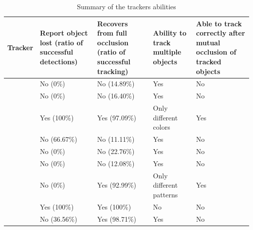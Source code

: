 \begin{landscape}
\begin{table}
\centering
\begin{tabular}{p{5cm}|p{3cm}|p{4cm}|p{5cm}|p{5cm}}
Tracker & Report object lost (ratio of successful detections) & Recovers from full occlusion (ratio of successful tracking)& Ability to track multiple objects & Able to track correctly after mutual occlusion of tracked objects \\
\hline
\boost{} & No (0\%)& No (14.89\%) & Yes & No \\
\corr{} & No (0\%)& No (16.40\%)& Yes & No \\
\hsv{} & Yes (100\%)& Yes (97.09\%) & Only different colors & Yes \\
\medflow{} & No (66.67\%)& No (11.11\%)& Yes & No \\
\mil{} & No (0\%) & No (22.76\%) & Yes & No \\
\mosse{} & No (0\%) & No (12.08\%) & Yes & No \\
\patt{} & No (0\%) & Yes (92.99\%) & Only different patterns & Yes \\
\simback{} & Yes (100\%) & Yes (100\%) & No & No \\
\tld{} & No (36.56\%) & Yes (98.71\%) & Yes & No \\
\end{tabular}
\caption{Summary of the trackers abilities}
\label{table:occlusion-multiple}
\end{table}
\end{landscape}

